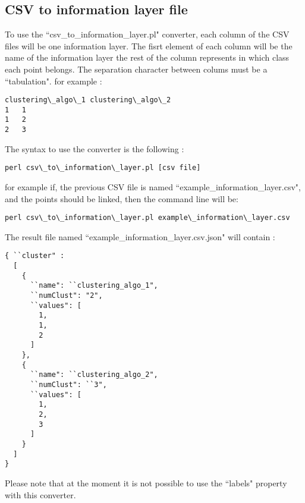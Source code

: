 \documentclass{bioinfo}
\begin{document}
\subsection{CSV to information layer file}
To use the ``csv\_to\_information\_layer.pl" converter, each column of the CSV files will be one information layer. The fisrt element of each column will be the name of the information layer the rest of the column represents in which class each point belongs. The separation character between colums must be a ``tabulation". for example :
\begin{lstlisting}
clustering\_algo\_1	clustering\_algo\_2
1	1
1	2
2	3
\end{lstlisting}
The syntax to use the converter is the following :
\begin{lstlisting}
perl csv\_to\_information\_layer.pl [csv file]
\end{lstlisting}
for example if, the previous CSV file is named ``example\_information\_layer.csv", and the points should be linked, then the command line will be:
\begin{lstlisting}
perl csv\_to\_information\_layer.pl example\_information\_layer.csv
\end{lstlisting}
The result file named ``example\_information\_layer.csv.json" will contain :
\begin{lstlisting}
{ ``cluster" :
  [
    {
      ``name": ``clustering_algo_1",
      ``numClust": "2",
      ``values": [
        1,
        1,
        2
      ]
    },
    {
      ``name": ``clustering_algo_2",
      ``numClust": ``3",
      ``values": [
        1,
        2,
        3
      ]
    }
  ]
}
\end{lstlisting}
Please note that at the moment it is not possible to use the ``labels" property with this converter. 
\end{document}
